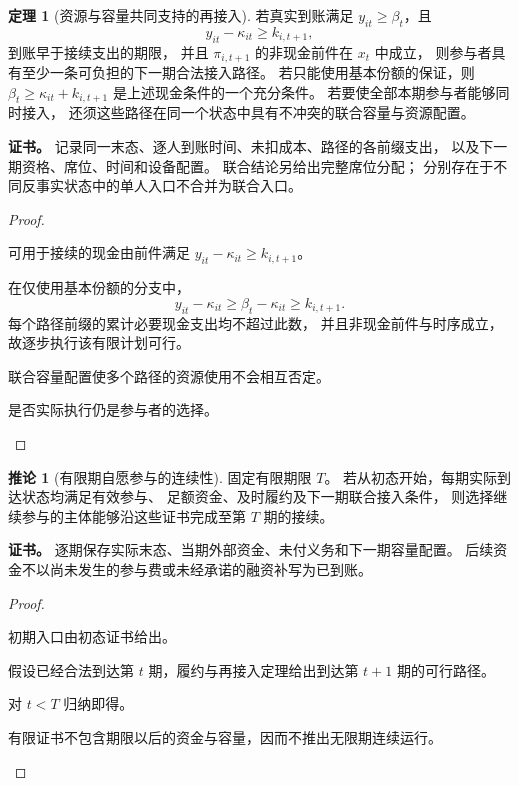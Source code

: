 \documentclass[UTF8,12pt,a4paper,openany,fontset=none,zihao=false]{ctexrep}
\theoremstyle{definition}
\newtheorem{theorem}{定理}[chapter]
\newtheorem{corollary}{推论}[chapter]
\newenvironment{certificate}{\par\noindent\textbf{证书。}\ignorespaces}{\par}
\newcommand{\1}{\mathbf 1}
\begin{document}
\begin{theorem}[资源与容量共同支持的再接入]
\label{part:thm-reentry}
若真实到账满足 \(y_{it}\ge\beta_t\)，且
\[
 y_{it}-\kappa_{it}\ge k_{i,t+1},
\]
到账早于接续支出的期限，
并且 \(\pi_{i,t+1}\) 的非现金前件在 \(x_t\) 中成立，
则参与者具有至少一条可负担的下一期合法接入路径。
若只能使用基本份额的保证，则 \(\beta_t\ge\kappa_{it}+k_{i,t+1}\) 是上述现金条件的一个充分条件。
若要使全部本期参与者能够同时接入，
还须这些路径在同一个状态中具有不冲突的联合容量与资源配置。
\end{theorem}
\begin{certificate}
记录同一末态、逐人到账时间、未扣成本、路径的各前缀支出，
以及下一期资格、席位、时间和设备配置。
联合结论另给出完整席位分配；
分别存在于不同反事实状态中的单人入口不合并为联合入口。
\end{certificate}
\begin{proof}
\begin{semanticsteps}
\item 可用于接续的现金由前件满足 \(y_{it}-\kappa_{it}\ge k_{i,t+1}\)。
\item 在仅使用基本份额的分支中，
\[
 y_{it}-\kappa_{it}
 \ge\beta_t-\kappa_{it}\ge k_{i,t+1}.
\]
每个路径前缀的累计必要现金支出均不超过此数，
并且非现金前件与时序成立，故逐步执行该有限计划可行。
\item 联合容量配置使多个路径的资源使用不会相互否定。
\item 是否实际执行仍是参与者的选择。
\end{semanticsteps}
\end{proof}

\begin{corollary}[有限期自愿参与的连续性]
\label{part:cor-finite-continuity}
固定有限期限 \(T\)。
若从初态开始，每期实际到达状态均满足有效参与、
足额资金、及时履约及下一期联合接入条件，
则选择继续参与的主体能够沿这些证书完成至第 \(T\) 期的接续。
\end{corollary}
\begin{certificate}
逐期保存实际末态、当期外部资金、未付义务和下一期容量配置。
后续资金不以尚未发生的参与费或未经承诺的融资补写为已到账。
\end{certificate}
\begin{proof}
\begin{semanticsteps}
\item 初期入口由初态证书给出。
\item 假设已经合法到达第 \(t\) 期，履约与再接入定理给出到达第 \(t+1\) 期的可行路径。
\item 对 \(t<T\) 归纳即得。
\item 有限证书不包含期限以后的资金与容量，因而不推出无限期连续运行。
\end{semanticsteps}
\end{proof}
\end{document}
